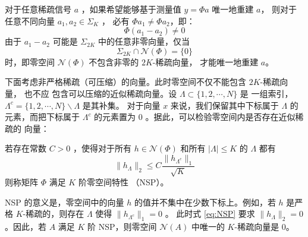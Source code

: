 对于任意稀疏信号 $a$ ，如果希望能够基于测量值 $y = \Phi a$ 唯一地重建 $a$，
则对于任意不同向量 $a_1, a_2 \in \Sigma_K$ ，
必有 $\Phi a_1 \neq \Phi a_2$，即：
\begin{equation}
\Phi (a_1 - a_2) \neq 0
\end{equation}
由于 $a_1 - a_2$ 可能是 $\Sigma_{2K}$ 中的任意非零向量，仅当
\begin{equation}
\Sigma_{2K} \cap \mathcal{N}(\Phi) = \{0\}
\end{equation}
时，即零空间 $\mathcal{N}(\Phi)$ 不包含非零的 $2K$-稀疏向量，
才能唯一地重建 $a$。

下面考虑非严格稀疏（可压缩）的向量。此时零空间不仅不能包含 $2K$-稀疏向量，
也不应
包含可以压缩的近似稀疏向量。设 $\Lambda \subset \{1, 2, \cdots, N\}$ 是
一组索引， $\Lambda^c = \{1,2,\cdots,N\} \backslash \Lambda$ 是其补集。
对于向量 $x$ 来说，我们保留其中下标属于 $\Lambda$ 的元素，而把下标属于
$\Lambda^c$ 的元素置为 $0$ 。据此，可以检验零空间内是否存在近似稀疏的
向量：
\begin{definition}[$K$ 阶零空间特性]
若存在常数 $C > 0$ ，使得对于所有 $h \in \mathcal{N}(\Phi)$ 和所有
$|\Lambda| \leq K$ 的 $\Lambda$ 都有
\begin{equation} \label{eq:NSP}
\|h_\Lambda\|_2 \leq C \frac{\|h_{\Lambda^c}\|_1}{\sqrt{K}}
\end{equation}
则称矩阵 $\Phi$ 满足 $K$ 阶零空间特性 （NSP）。
\end{definition}
NSP 的意义是，零空间中的向量 $h$ 的值并不集中在少数下标上。例如，若 $h$
是严格 $K$-稀疏的，则存在 $\Lambda$ 使得 $\|h_{\Lambda^c}\|_1 = 0$ 。
此时式 \ref{eq:NSP} 要求 $\|h_\Lambda\|_2 = 0$。因此，若 $A$ 满足 $K$
阶 NSP，则零空间 $\mathcal{N}(A)$ 中唯一的 $K$-稀疏向量是 $0$。

% 

